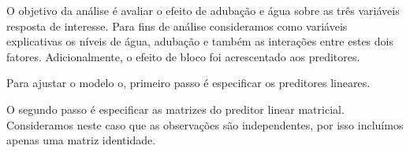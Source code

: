 \begin{knitrout}
\color{fgcolor}\begin{kframe}
\begin{alltt}
\hlstd{(}\hlstd{,}  \hlstd{=} \hlstd{)}
\end{alltt}
\end{kframe}
\end{knitrout}

O objetivo da análise é avaliar o efeito de adubação e água sobre as três variáveis resposta de interesse. Para fins de análise consideramos como variáveis explicativas os níveis de água, adubação e também as interações entre estes dois fatores. Adicionalmente, o efeito de bloco foi acrescentado aos preditores. 

Para ajustar o modelo o, primeiro passo é especificar os preditores lineares.

\begin{knitrout}
\color{fgcolor}\begin{kframe}
\begin{alltt}
 \hlkwb{<-}  \hlopt{~}  \hlopt{+}  \hlopt{*} 
 \hlkwb{<-}  \hlopt{~}  \hlopt{+}  \hlopt{*} 

\hlopt{$} \hlkwb{<-} \hlopt{$} \hlopt{/} \hlopt{$}
 \hlkwb{<-}  \hlopt{~}  \hlopt{+}  \hlopt{*} 
\end{alltt}
\end{kframe}
\end{knitrout}

O segundo passo é especificar as matrizes do preditor linear matricial. Consideramos neste caso que as observações são independentes, por isso incluímos apenas uma matriz identidade.

\begin{knitrout}
\color{fgcolor}\begin{kframe}
\begin{alltt}
 \hlkwb{<-} 
\end{alltt}
\end{kframe}
\end{knitrout}

